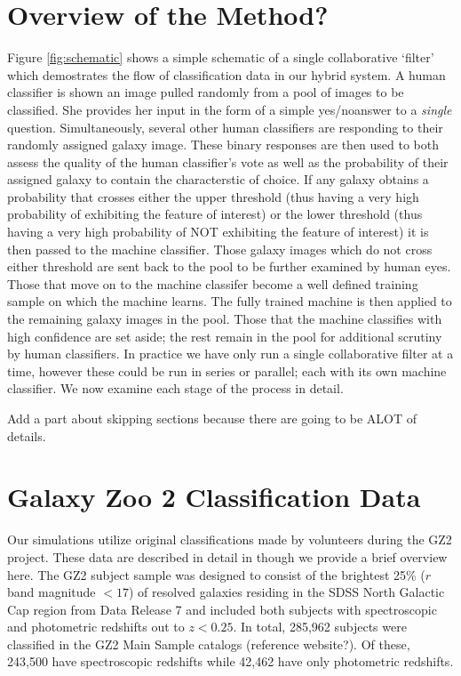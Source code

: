\documentclass[twocolumn]{aastex6}
\begin{document}
\section{Overview of the Method?}
Figure \ref{fig:schematic} shows a simple schematic of a single collaborative `filter' which demostrates the flow of classification data in our hybrid system.  A human classifier is shown an image pulled randomly from a pool of images to be classified. She provides her input in the form of a simple yes/noanswer to a \textit{single} question. Simultaneously, several other human classifiers are responding to their randomly assigned galaxy image. These binary responses are then used to both assess the quality of the human classifier's vote as well as the probability of their assigned galaxy to contain the characterstic of choice. If any galaxy obtains a probability that crosses either the upper threshold (thus having a very high probability of exhibiting the feature of interest) or the lower threshold (thus having a very high probability of NOT exhibiting the feature of interest) it is then passed to the machine classifier. Those galaxy images which do not cross either threshold are sent back to the pool to be further examined by human eyes. Those that move on to the machine classifer become a well defined training sample on which the machine learns. The fully trained machine is then applied to the remaining galaxy images in the  pool. Those that the machine classifies with high confidence are set aside; the rest remain in the pool for additional scrutiny by human classifiers.  In practice we have only run a single collaborative filter at a time, however these could be run in series or parallel; each with its own machine classifier. We now examine each stage of the process in detail. 

Add a part about skipping sections because there are going to be ALOT of details. 


\section{Galaxy Zoo 2 Classification Data} \label{sec:data}

Our simulations utilize original classifications made by volunteers during the GZ2 project. 
These data are described in detail in \citep{Willett2013} though we provide a brief overview here.  
The GZ2 subject sample was designed to consist of the brightest 25\% ($r$ band magnitude $< 17$) 
of resolved galaxies residing in the SDSS North Galactic Cap region from Data Release 7 
and included both subjects with spectroscopic and photometric redshifts out to $z < 0.25$.
In total, 285,962 subjects were classified in the GZ2 Main Sample catalogs (reference website?). 
Of these, 243,500 have spectroscopic redshifts while 42,462 have only photometric redshifts.  
\end{document}
